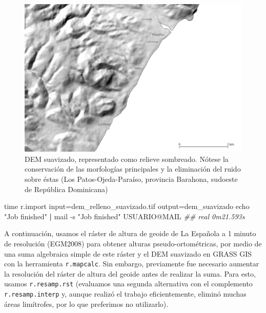 \documentclass[spanish]{article}
\newenvironment{Shaded}{\begin{snugshade}}{\end{snugshade}}
\newcommand{\AttributeTok}[1]{\textcolor[rgb]{0.77,0.63,0.00}{#1}}
\newcommand{\BuiltInTok}[1]{#1}
\newcommand{\CommentTok}[1]{\textcolor[rgb]{0.56,0.35,0.01}{\textit{#1}}}
\newcommand{\ExtensionTok}[1]{#1}
\newcommand{\KeywordTok}[1]{\textcolor[rgb]{0.13,0.29,0.53}{\textbf{#1}}}
\newcommand{\NormalTok}[1]{#1}
\newcommand{\StringTok}[1]{\textcolor[rgb]{0.31,0.60,0.02}{#1}}
\begin{document}
\begin{figure}

{\centering \includegraphics[width=1\linewidth]{figuras/dem-suavizado} 

}

\caption{DEM suavizado, representado como relieve sombreado. Nótese la conservación de las morfologías principales y la eliminación del ruido sobre éstas (Los Patos-Ojeda-Paraíso, provincia Barahona, sudoeste de República Dominicana)}\label{fig:demsuavizado}
\end{figure}

\begin{Shaded}
\begin{Highlighting}[]
\BuiltInTok{time}\NormalTok{ r.import input=dem\_relleno\_suavizado.tif output=dem\_suavizado}
\BuiltInTok{echo} \StringTok{"Job finished"} \KeywordTok{|} \ExtensionTok{mail} \AttributeTok{{-}s} \StringTok{"Job finished"}\NormalTok{ USUARIO@MAIL}
\CommentTok{\#\# real 0m21.593s}
\end{Highlighting}
\end{Shaded}

A continuación, usamos el ráster de altura de geoide de La Española a 1
minuto de resolución (EGM2008) para obtener alturas pseudo-ortométricas,
por medio de una suma algebraica simple de este ráster y el DEM
suavizado en GRASS GIS con la herramienta \texttt{r.mapcalc}. Sin
embargo, previamente fue necesario aumentar la resolución del ráster de
altura del geoide antes de realizar la suma. Para esto, usamos
\texttt{r.resamp.rst} (evaluamos una segunda alternativa con el
complemento \texttt{r.resamp.interp} y, aunque realizó el trabajo
eficientemente, eliminó muchas áreas limítrofes, por lo que preferimos
no utilizarlo).
\end{document}
